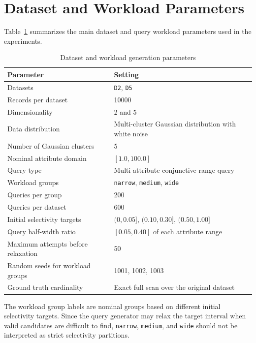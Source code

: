 \section{Dataset and Workload Parameters}

Table~\ref{tab:app_dataset_workload_parameters} summarizes the main dataset and
query workload parameters used in the experiments.

\begin{table}[htbp]
    \centering
    \caption{Dataset and workload generation parameters}
    \label{tab:app_dataset_workload_parameters}
    \small
    \begin{tabular}{ll}
        \toprule
        Parameter & Setting \\
        \midrule
        Datasets & \texttt{D2}, \texttt{D5} \\
        Records per dataset & 10000 \\
        Dimensionality & 2 and 5 \\
        Data distribution & Multi-cluster Gaussian distribution with white noise \\
        Number of Gaussian clusters & 5 \\
        Nominal attribute domain & $[1.0, 100.0]$ \\
        Query type & Multi-attribute conjunctive range query \\
        Workload groups & \texttt{narrow}, \texttt{medium}, \texttt{wide} \\
        Queries per group & 200 \\
        Queries per dataset & 600 \\
        Initial selectivity targets & $(0,0.05]$, $(0.10,0.30]$, $(0.50,1.00]$ \\
        Query half-width ratio & $[0.05, 0.40]$ of each attribute range \\
        Maximum attempts before relaxation & 50 \\
        Random seeds for workload groups & 1001, 1002, 1003 \\
        Ground truth cardinality & Exact full scan over the original dataset \\
        \bottomrule
    \end{tabular}
\end{table}

The workload group labels are nominal groups based on different initial
selectivity targets. Since the query generator may relax the target interval
when valid candidates are difficult to find, \texttt{narrow}, \texttt{medium},
and \texttt{wide} should not be interpreted as strict selectivity partitions.

